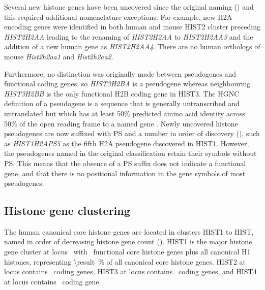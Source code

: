     Several new histone genes have been uncovered since the original
    naming ()
    and this required additional nomenclature exceptions.
    For example, new H2A encoding genes were identified in both human
    and mouse HIST2 cluster preceding \textit{HIST2H2AA}
    leading to the renaming of \textit{HIST2H2AA} to \textit{HIST2H2AA3}
    and the addition of a new human gene as \textit{HIST2H2AA4}.
    There are no human orthologs of mouse \textit{Hist2h2aa1} and \textit{Hist2h2aa2}.

    Furthermore, no distinction was originally made between
    pseudogenes and functional coding genes,
    so \textit{HIST3H2BA} is a pseudogene whereas neighbouring
    \textit{HIST3H2BB} is the only functional H2B coding gene in HIST3.
    The HGNC definition of a pseudogene is 
    a sequence that is generally untranscribed and untranslated 
    but which has at least 50\% predicted amino acid identity 
    across 50\% of the open reading frame to a named gene \citep{HGNC2013}.
    Newly uncovered histone pseudogenes are now suffixed with PS and a
    number in order of discovery (),
    such as \textit{HIST1H2APS5} as the fifth H2A pseudogene discovered in HIST1.
    However, the pseudogenes named in the original classification retain their symbols without PS.
    This means that the absence of a PS suffix does not indicate a functional gene,
    and that there is no positional information in the gene symbols of most pseudogenes.

  \subsection{Histone gene clustering}
    The human canonical core histone genes are located in clusters HIST1 to HIST\NumberOfClusters{},
    named in order of decreasing histone gene count ().
    HIST1 is the major histone gene cluster at locus~\HISTOneLocus{}
    with \CoreCodingGenesInHISTOne{}~functional core histone genes plus all canonical H1 histones,
    representing  \SI{\result}{\percent}
    of all canonical core histone genes.
    HIST2 at locus \HISTTwoLocus{} contains \CoreCodingGenesInHISTTwo{}~coding genes,
    HIST3 at locus \HISTThreeLocus{} contains \CoreCodingGenesInHISTThree{}~coding genes,
    and HIST4 at locus \HISTFourLocus{} contains \CoreCodingGenesInHISTFour{}~coding gene.

